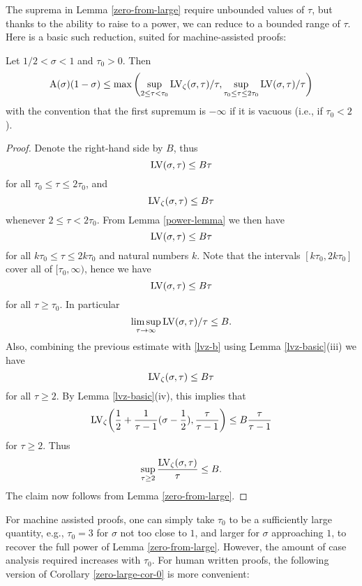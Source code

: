 The suprema in Lemma \ref{zero-from-large} require unbounded values of $\tau$, but thanks to the ability to raise to a power, we can reduce to a bounded range of $\tau$.  Here is a basic such reduction, suited for machine-assisted proofs:

\begin{corollary}\label{zero-large-cor-0} Let $1/2 < \sigma < 1$ and $\tau_0 > 0$.  Then
    $$ \mathrm{A}(\sigma)(1-\sigma) \leq \max \left(\sup_{2 \leq \tau < \tau_0} \mathrm{LV}_\zeta(\sigma,\tau)/\tau, \sup_{\tau_0 \leq \tau \leq 2\tau_0} \mathrm{LV}(\sigma,\tau)/\tau\right)$$
    with the convention that the first supremum is $-\infty$ if it is vacuous (i.e., if $\tau_0 < 2$).
    \end{corollary}

    \begin{proof}  Denote the right-hand side by $B$, thus
    $$ \mathrm{LV}(\sigma,\tau) \leq B\tau$$
    for all $\tau_0 \leq \tau \leq 2\tau_0$, and
    \begin{equation}\label{lvz-b}
         \mathrm{LV}_\zeta(\sigma,\tau) \leq B\tau
    \end{equation}
    whenever $2 \leq \tau < 2\tau_0$.  From Lemma \ref{power-lemma} we then have
    $$ \mathrm{LV}(\sigma,\tau) \leq B\tau$$
    for all $k\tau_0 \leq \tau \leq 2k\tau_0$ and natural numbers $k$. Note that the intervals $[k\tau_0, 2k\tau_0]$ cover all of $[\tau_0,\infty)$, hence we have
    $$ \mathrm{LV}(\sigma,\tau) \leq B\tau$$
    for all $\tau \geq \tau_0$. In particular
    $$ \limsup_{\tau \to \infty} \mathrm{LV}(\sigma,\tau)/\tau  \leq B.$$
    Also, combining the previous estimate with \eqref{lvz-b} using Lemma \ref{lvz-basic}(iii) we have
    \begin{equation}\label{lvzo}
     \mathrm{LV}_\zeta(\sigma,\tau) \leq B\tau
    \end{equation}
    for all $\tau \geq 2$.  By Lemma \ref{lvz-basic}(iv), this implies that
    $$ \mathrm{LV}_\zeta\bigg(\frac{1}{2} + \frac{1}{\tau-1} (\sigma-\frac{1}{2}), \frac{\tau}{\tau-1} \bigg) \leq B \frac{\tau}{\tau-1}$$
    for $\tau \geq 2$.  Thus
    $$ \sup_{\tau \geq 2} \frac{\mathrm{LV}_\zeta(\sigma,\tau)}{\tau} \leq B.$$
    The claim now follows from Lemma \ref{zero-from-large}.
    \end{proof}

For machine assisted proofs, one can simply take $\tau_0$ to be a sufficiently large quantity, e.g., $\tau_0=3$ for $\sigma$ not too close to $1$, and larger for $\sigma$ approaching $1$, to recover the full power of Lemma \ref{zero-from-large}.  However, the amount of case analysis required increases with $\tau_0$.  For human written proofs, the following version of Corollary \ref{zero-large-cor-0} is more convenient:

